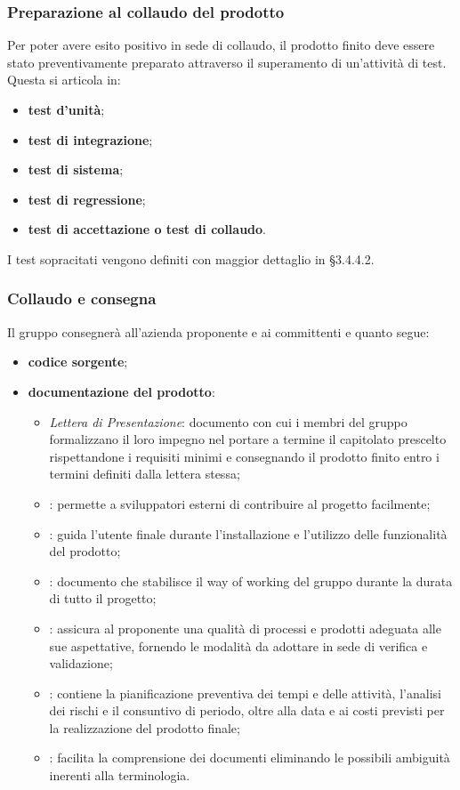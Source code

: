 \subsubsection{Preparazione al collaudo del prodotto}
Per poter avere esito positivo in sede di collaudo, il prodotto finito deve essere stato preventivamente preparato attraverso il superamento di un'attività di test.\\ Questa si articola in:
\begin{itemize}
	\item \textbf{test d'unità};
	\item \textbf{test di integrazione};
	\item \textbf{test di sistema};
	\item \textbf{test di regressione};
	\item \textbf{test di accettazione o test di collaudo}.
\end{itemize}
I test sopracitati vengono definiti con maggior dettaglio in §3.4.4.2.

\subsubsection{Collaudo e consegna}
Il gruppo \Omicron{} consegnerà all'azienda proponente e ai committenti \textit{\VT} e \textit{\CR} quanto segue:
\begin{itemize}
	\item \textbf{codice sorgente};
	\item \textbf{documentazione del prodotto}:
	\begin{itemize}
		\item \textit{Lettera di Presentazione}: documento con cui i membri del gruppo \Omicron{} formalizzano il loro impegno nel portare a termine il capitolato prescelto rispettandone i requisiti minimi e consegnando il prodotto finito entro i termini definiti dalla lettera stessa;
		\item {}: permette a sviluppatori esterni di contribuire al progetto facilmente;
		\item {}: guida l'utente finale durante l'installazione e l'utilizzo delle funzionalità del prodotto;
		\item {}: documento che stabilisce il way of working del gruppo durante la durata di tutto il progetto;
		\item {}: assicura al proponente una qualità di processi e prodotti adeguata alle sue aspettative, fornendo le modalità da adottare in sede di verifica e validazione;
		\item {}: contiene la pianificazione preventiva dei tempi e delle attività, l'analisi dei rischi e il consuntivo di periodo, oltre alla data e ai costi previsti per la realizzazione del prodotto finale;
		\item {}: facilita la comprensione dei documenti eliminando le possibili ambiguità inerenti alla terminologia.
	\end{itemize}
\end{itemize}

